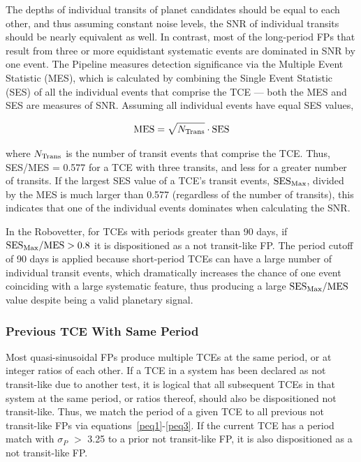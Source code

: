 The depths of individual transits of planet candidates should be equal to each other, and thus assuming constant noise levels, the SNR of individual transits should be nearly equivalent as well. In contrast, most of the long-period FPs that result from three or more equidistant systematic events are dominated in SNR by one event. The \kepler{} Pipeline measures detection significance via the Multiple Event Statistic (MES), which is calculated by combining the Single Event Statistic (SES) of all the individual events that comprise the TCE --- both the MES and SES are measures of SNR. Assuming all individual events have equal SES values,

\begin{equation}
{\rm MES} = \sqrt{N_{\rm Trans}} \cdot {\rm SES}
\end{equation}

\noindent where $N_{\rm Trans}$ is the number of transit events that comprise the TCE. Thus, SES/MES = 0.577 for a TCE with three transits, and less for a greater number of transits. If the largest SES value of a TCE's transit events, ${\rm SES}_{\rm Max}$, divided by the MES is much larger than 0.577 (regardless of the number of transits), this indicates that one of the individual events dominates when calculating the SNR.

In the Robovetter, for TCEs with periods greater than 90 days, if ${{\rm SES}_{\rm Max} / {\rm MES} > 0.8}$ it is dispositioned as a not transit-like FP. The period cutoff of 90 days is applied because short-period TCEs can have a large number of individual transit events, which dramatically increases the chance of one event coinciding with a large systematic feature, thus producing a large ${{\rm SES}_{\rm Max} / {\rm MES}}$ value despite being a valid planetary signal.



\subsubsection{Previous TCE With Same Period}
\label{s:sameperiod}
Most quasi-sinusoidal FPs produce multiple TCEs at the same period, or at integer ratios of each other. If a TCE in a system has been declared as not transit-like due to another test, it is logical that all subsequent TCEs in that system at the same period, or ratios thereof, should also be dispositioned not transit-like. Thus, we match the period of a given TCE to all previous not transit-like FPs via equations~\ref{peq1}-\ref{peq3}. If the current TCE has a period match with $\sigma_{P}$ $>$ 3.25 to a prior not transit-like FP, it is also dispositioned as a not transit-like FP.

